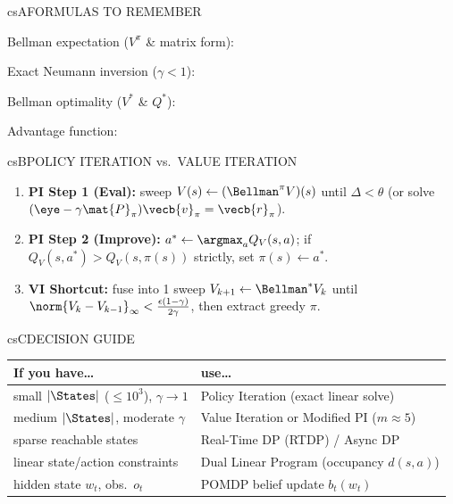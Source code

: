 \documentclass[../../../../master.tex]{subfiles}
\begin{document}
\begin{cscolumns}
\begin{cscard}{csA}{FORMULAS TO REMEMBER}
  \begin{csbul}
    \item Bellman expectation ($V^\pi$ \& matrix form):
    \item Exact Neumann inversion ($\gamma<1$):
    \item Bellman optimality ($V^*$ \& $Q^*$):
    \item Advantage function:
  \end{csbul}
\end{cscard}

\begin{cscard}{csB}{POLICY ITERATION vs.\ VALUE ITERATION}
  \begin{enumerate}[leftmargin=1.2em, itemsep=1pt, topsep=1pt, parsep=0pt]
    \item \textbf{PI Step 1 (Eval):} sweep $V(s)\gets (\Bellman^\pi V)(s)$ until $\Delta<\theta$ (or solve $(\eye-\gamma\mat{P}_\pi)\vecb{v}_\pi=\vecb{r}_\pi$).
    \item \textbf{PI Step 2 (Improve):} $a^*\gets\argmax_a Q_V(s,a)$; if $Q_V(s,a^*)>Q_V(s,\pi(s))$ strictly, set $\pi(s)\gets a^*$.
    \item \textbf{VI Shortcut:} fuse into 1 sweep $V_{k+1}\gets\Bellman^* V_k$ until $\norm{V_k-V_{k-1}}_\infty < \frac{\epsilon(1-\gamma)}{2\gamma}$, then extract greedy $\pi$.
  \end{enumerate}
\end{cscard}
\columnbreak

\begin{cscard}{csC}{DECISION GUIDE}
  \renewcommand{\arraystretch}{1.18}\small
  \begin{tabular}{@{}>{\raggedright\arraybackslash}p{3.2cm}>{\raggedright\arraybackslash}p{4.6cm}@{}}
    \textbf{If you have\ldots} & \textbf{use\ldots}\\ \hline
    small $|\States|$ ($\le 10^3$), $\gamma\to 1$ & Policy Iteration (exact linear solve)\\
    medium $|\States|$, moderate $\gamma$ & Value Iteration or Modified PI ($m\approx 5$)\\
    sparse reachable states & Real-Time DP (RTDP) / Async DP\\
    linear state/action constraints & Dual Linear Program (occupancy $d(s,a)$)\\
    hidden state $w_t$, obs.\ $o_t$ & POMDP belief update $b_t(w_t)$\\
  \end{tabular}
\end{cscard}


\end{cscolumns}
\end{document}
